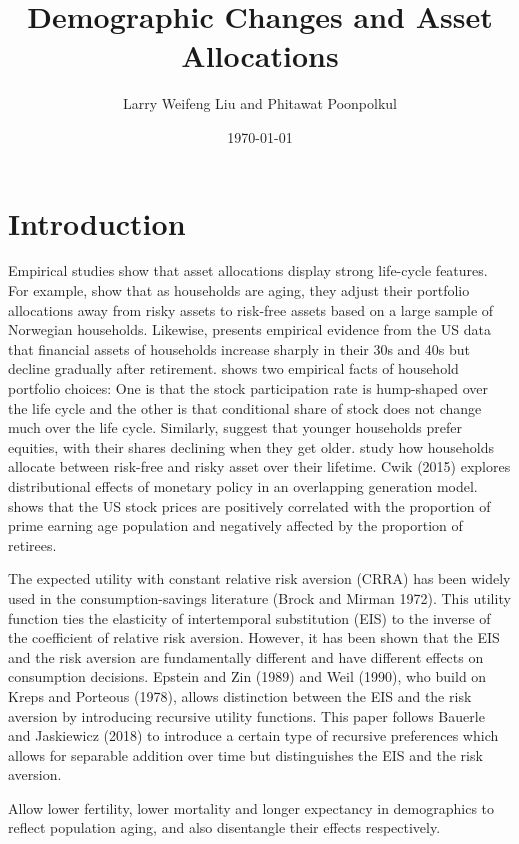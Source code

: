 \documentclass[12pt]{article}
\title{Demographic Changes and Asset Allocations}
\author{Larry Weifeng Liu and Phitawat Poonpolkul}
\date{\today}
\begin{document}
	
\maketitle

\section{Introduction}
Empirical studies show that asset allocations display strong life-cycle features. For example, \cite{fagereng2017asset} show that as households are aging, they adjust their portfolio allocations away from risky assets to risk-free assets based on a large sample of Norwegian households. Likewise, \cite{poterba2004impact} presents empirical evidence from the US data that financial assets of households increase sharply in their 30s and 40s but decline gradually after retirement. \cite{campanale2009life} shows two empirical facts of household portfolio choices: One is that the stock participation rate is hump-shaped over the life cycle and the other is that conditional share of stock does not change much over the life cycle. Similarly, \cite{gomes2008optimal} suggest that younger households prefer equities, with their shares declining when they get older. \cite{smetters2010optimal} study how households allocate between risk-free and risky asset over their lifetime. Cwik (2015) explores distributional effects of monetary policy in an overlapping generation model. \cite{quayes2016impact} shows that the US stock prices are positively correlated with the proportion of prime earning age population and negatively affected by the proportion of retirees.

The expected utility with constant relative risk aversion (CRRA) has been widely used in the consumption-savings literature (Brock and Mirman 1972). This utility function ties the elasticity of intertemporal substitution (EIS) to the inverse of the coefficient of relative risk aversion. However, it has been shown that the EIS and the risk aversion are fundamentally different and have different effects on consumption decisions. Epstein and Zin (1989) and Weil (1990), who build on Kreps and Porteous (1978), allows distinction between the EIS and the risk aversion by introducing recursive utility functions. This paper follows Bauerle and Jaskiewicz (2018) to introduce a certain type of recursive preferences which allows for separable addition over time but distinguishes the EIS and the risk aversion. 

Allow lower fertility, lower mortality and longer expectancy in demographics to reflect population aging, and also disentangle their effects respectively.
\end{document}
